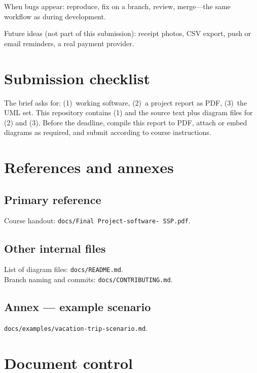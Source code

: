 \documentclass[11pt,a4paper]{article}
\begin{document}
When bugs appear: reproduce, fix on a branch, review, merge---the same workflow as during development.

Future ideas (not part of this submission): receipt photos, CSV export, push or email reminders, a real payment provider.

\section{Submission checklist}

The brief asks for: (1)~working software, (2)~a project report as PDF, (3)~the UML set. This repository contains (1) and the source text plus diagram files for (2) and (3). Before the deadline, compile this report to PDF, attach or embed diagrams as required, and submit according to course instructions.

\section{References and annexes}
\label{sec:refs}

\subsection{Primary reference}

Course handout: \texttt{docs/Final Project-software- SSP.pdf}.

\subsection{Other internal files}

\noindent List of diagram files: \texttt{docs/README.md}.\\
Branch naming and commits: \texttt{docs/CONTRIBUTING.md}.

\subsection{Annex --- example scenario}
\label{sec:annex}

\texttt{docs/examples/vacation-trip-scenario.md}.

\section{Document control}
\end{document}
